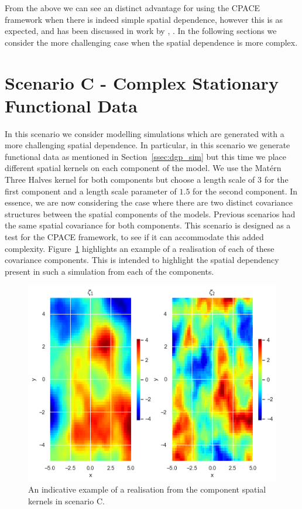 From the above we can see an distinct advantage for using the CPACE framework when there is indeed simple spatial dependence, however this is as expected, and has been discussed in work by \citeauthor{liu_functional_2017}, \citep{liu_functional_2017}.
In the following sections we consider the more challenging case when the spatial dependence is more complex.

\section{Scenario C - Complex Stationary Functional Data \label{sec:sim_C}}

In this scenario we consider modelling simulations which are generated with a more challenging spatial dependence.
In particular, in this scenario we generate functional data as mentioned in Section~\ref{ssec:dgp_sim} but this time we place different spatial kernels on each component of the model.
We use the Mat\'ern Three Halves kernel for both components but choose a length scale of $3$ for the first component and a length scale parameter of $1.5$ for the second component.
In essence, we are now considering the case where there are two distinct covariance structures between the spatial components of the models.
Previous scenarios had the same spatial covariance for both components.
This scenario is designed as a test for the CPACE framework, to see if it can accommodate this added complexity.
Figure~\ref{fig:sim_example_C} highlights an example of a realisation of each of these covariance components. 
This is intended to highlight the spatial dependency present in such a simulation from each of the components.

\begin{figure}
	\centering
	\includegraphics[width=\textwidth]{sim_ex_zeta_C}
	\caption[An indicative example of a realisation from the component spatial kernels in scenario C.]{An indicative example of a realisation from the component spatial kernels in scenario C.}
	\label{fig:sim_example_C}
\end{figure}

